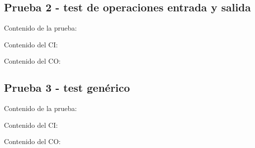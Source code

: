 \documentclass[11pt, , a4paper, titlepage]{article}
\newenvironment{changemargin}[2]{%
\begin{list}{}{%
\setlength{\topsep}{0pt}%
\setlength{\leftmargin}{#1}%
\setlength{\rightmargin}{#2}%
\setlength{\listparindent}{\parindent}%
\setlength{\itemindent}{\parindent}%
\setlength{\parsep}{\parskip}%
}%
\item[]}{\end{list}}
\begin{document}
\clearpage

\subsection{Prueba 2 - test de operaciones entrada y salida}
\vspace{2mm}
Contenido de la prueba:
\vspace{2mm}
\begin{changemargin}{+3cm}{+2cm}
    
\end{changemargin} 
\vspace{2mm}
Contenido del CI:
\vspace{2mm}
\begin{changemargin}{+1cm}{+0cm}
    
\end{changemargin} 
\vspace{2mm}
Contenido del CO:
\vspace{2mm}
\begin{changemargin}{+1cm}{-2cm}
    
\end{changemargin} 

\clearpage

\subsection{Prueba 3 - test genérico}
\vspace{2mm}
Contenido de la prueba:
\vspace{2mm}
\begin{changemargin}{+3cm}{+2cm}
    
\end{changemargin} 
\vspace{2mm}
Contenido del CI:
\vspace{2mm}
\begin{changemargin}{+1cm}{+0cm}
    
\end{changemargin} 
\vspace{2mm}
Contenido del CO:
\vspace{2mm}
\begin{changemargin}{+1cm}{-2cm}
    
\end{changemargin} 
\end{document}
